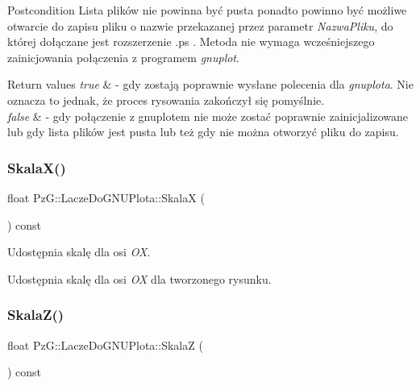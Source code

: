 \begin{DoxyPostcond}{Postcondition}
Lista plików nie powinna być pusta ponadto powinno być możliwe otwarcie do zapisu pliku o nazwie przekazanej przez parametr {\itshape Nazwa\+Pliku}, do której dołączane jest rozszerzenie .ps . Metoda nie wymaga wcześniejszego zainicjowania połączenia z programem {\itshape gnuplot}.
\end{DoxyPostcond}

\begin{DoxyRetVals}{Return values}
{\em true} & -\/ gdy zostają poprawnie wysłane polecenia dla {\itshape gnuplota}. Nie oznacza to jednak, że proces rysowania zakończył się pomyślnie. \\
\hline
{\em false} & -\/ gdy połączenie z gnuplotem nie może zostać poprawnie zainicjalizowane lub gdy lista plików jest pusta lub też gdy nie można otworzyć pliku do zapisu. \\
\hline
\end{DoxyRetVals}
\mbox{\label{classPzG_1_1LaczeDoGNUPlota_a4b1eb252fd785a5aeff938e7b2dce2b1}} 
\subsubsection{\texorpdfstring{Skala\+X()}{SkalaX()}}
{\footnotesize\ttfamily float Pz\+G\+::\+Lacze\+Do\+G\+N\+U\+Plota\+::\+SkalaX (\begin{DoxyParamCaption}{ }\end{DoxyParamCaption}) const\hspace{0.3cm}{\ttfamily [inline]}}



Udostępnia skalę dla osi {\itshape OX}. 

Udostępnia skalę dla osi {\itshape OX} dla tworzonego rysunku. \mbox{\label{classPzG_1_1LaczeDoGNUPlota_a44f922ccbc508d6cd7809c669238dae3}} 
\subsubsection{\texorpdfstring{Skala\+Z()}{SkalaZ()}}
{\footnotesize\ttfamily float Pz\+G\+::\+Lacze\+Do\+G\+N\+U\+Plota\+::\+SkalaZ (\begin{DoxyParamCaption}{ }\end{DoxyParamCaption}) const\hspace{0.3cm}{\ttfamily [inline]}}



